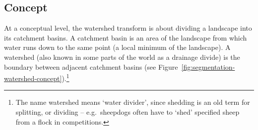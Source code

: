 \subsection{Concept}

At a conceptual level, the watershed transform is about dividing a landscape into its catchment basins. A catchment basin is an area of the landscape from which water runs down to the same point (a local minimum of the landscape). A watershed (also known in some parts of the world as a drainage divide) is the boundary between adjacent catchment basins (see Figure~\ref{fig:segmentation-watershed-concept}).\footnote{The name watershed means `water divider', since shedding is an old term for splitting, or dividing -- e.g.~sheepdogs often have to `shed' specified sheep from a flock in competitions.}



